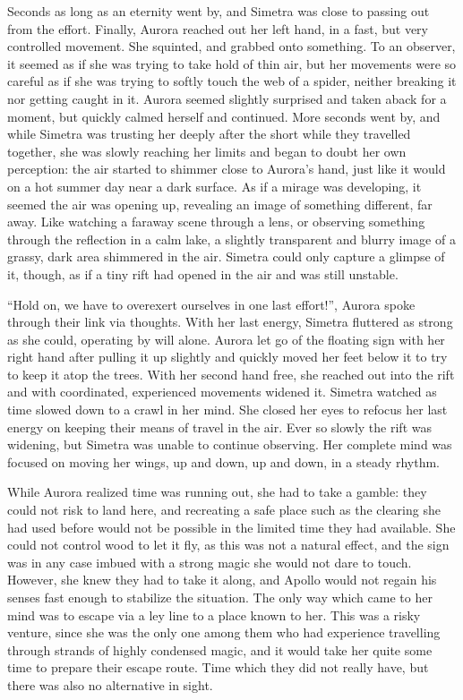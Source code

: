 Seconds as long as an eternity went by, and Simetra was close to passing out from the effort. Finally, Aurora reached out her left hand, in a fast, but very controlled movement. She squinted, and grabbed onto something. To an observer, it seemed as if she was trying to take hold of thin air, but her movements were so careful as if she was trying to softly touch the web of a spider, neither breaking it nor getting caught in it. Aurora seemed slightly surprised and taken aback for a moment, but quickly calmed herself and continued. More seconds went by, and while Simetra was trusting her deeply after the short while they travelled together, she was slowly reaching her limits and began to doubt her own perception: the air started to shimmer close to Aurora's hand, just like it would on a hot summer day near a dark surface. As if a mirage was developing, it seemed the air was opening up, revealing an image of something different, far away. Like watching a faraway scene through a lens, or observing something through the reflection in a calm lake, a slightly transparent and blurry image of a grassy, dark area shimmered in the air. Simetra could only capture a glimpse of it, though, as if a tiny rift had opened in the air and was still unstable.

\enquote{Hold on, we have to overexert ourselves in one last effort!}, Aurora spoke through their link via thoughts. With her last energy, Simetra fluttered as strong as she could, operating by will alone. Aurora let go of the floating sign with her right hand after pulling it up slightly and quickly moved her feet below it to try to keep it atop the trees. With her second hand free, she reached out into the rift and with coordinated, experienced movements widened it. Simetra watched as time slowed down to a crawl in her mind. She closed her eyes to refocus her last energy on keeping their means of travel in the air. Ever so slowly the rift was widening, but Simetra was unable to continue observing. Her complete mind was focused on moving her wings, up and down, up and down, in a steady rhythm.

\fancybreaker{}

While Aurora realized time was running out, she had to take a gamble: they could not risk to land here, and recreating a safe place such as the clearing she had used before would not be possible in the limited time they had available. She could not control wood to let it fly, as this was not a natural effect, and the sign was in any case imbued with a strong magic she would not dare to touch. However, she knew they had to take it along, and Apollo would not regain his senses fast enough to stabilize the situation. The only way which came to her mind was to escape via a ley line to a place known to her. This was a risky venture, since she was the only one among them who had experience travelling through strands of highly condensed magic, and it would take her quite some time to prepare their escape route. Time which they did not really have, but there was also no alternative in sight.

